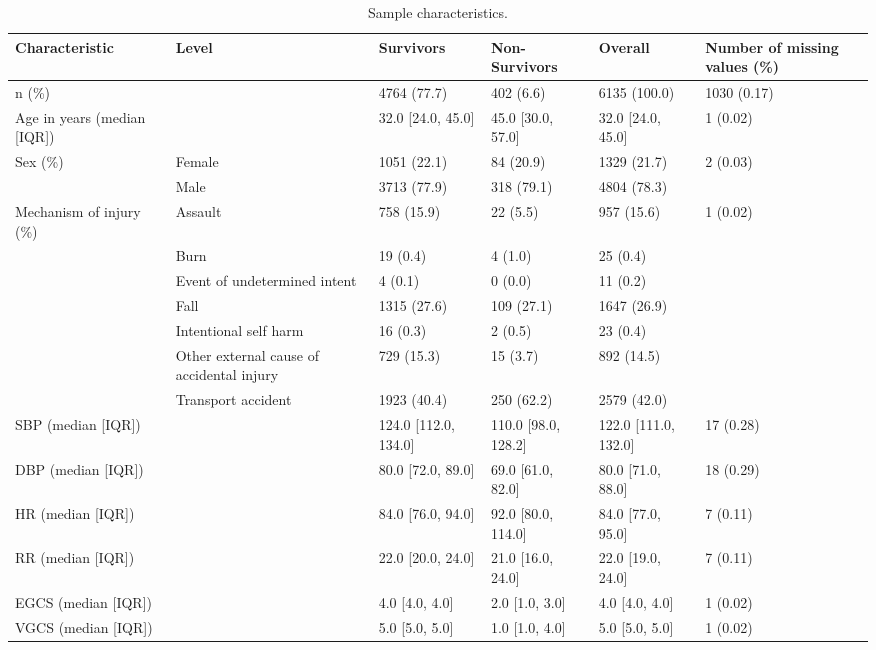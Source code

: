 \begin{table}[!ht]
\centering
\caption{Sample characteristics.} 
\label{tab:sample-characteristics}
\begin{adjustbox}{max width = \linewidth} 
\begin{threeparttable} 
\begin{tabular} 
{llllll}
  \toprule
Characteristic & Level & Survivors & Non-Survivors & Overall & Number of missing values (\%) \\ 
  \midrule
n (\%) &  & 4764 (77.7) & 402 (6.6) & 6135 (100.0) & 1030 (0.17) \\ 
  Age in years (median [IQR]) &  & 32.0 [24.0, 45.0] & 45.0 [30.0, 57.0] & 32.0 [24.0, 45.0] & 1 (0.02) \\ 
  Sex (\%) & Female & 1051 (22.1) & 84 (20.9) & 1329 (21.7) & 2 (0.03) \\ 
   & Male & 3713 (77.9) & 318 (79.1) & 4804 (78.3) &  \\ 
  Mechanism of injury (\%) & Assault & 758 (15.9) & 22 (5.5) & 957 (15.6) & 1 (0.02) \\ 
   & Burn & 19 (0.4) & 4 (1.0) & 25 (0.4) &  \\ 
   & Event of undetermined intent & 4 (0.1) & 0 (0.0) & 11 (0.2) &  \\ 
   & Fall & 1315 (27.6) & 109 (27.1) & 1647 (26.9) &  \\ 
   & Intentional self harm & 16 (0.3) & 2 (0.5) & 23 (0.4) &  \\ 
   & Other external cause of accidental injury & 729 (15.3) & 15 (3.7) & 892 (14.5) &  \\ 
   & Transport accident & 1923 (40.4) & 250 (62.2) & 2579 (42.0) &  \\ 
  SBP (median [IQR]) &  & 124.0 [112.0, 134.0] & 110.0 [98.0, 128.2] & 122.0 [111.0, 132.0] & 17 (0.28) \\ 
  DBP (median [IQR]) &  & 80.0 [72.0, 89.0] & 69.0 [61.0, 82.0] & 80.0 [71.0, 88.0] & 18 (0.29) \\ 
  HR (median [IQR]) &  & 84.0 [76.0, 94.0] & 92.0 [80.0, 114.0] & 84.0 [77.0, 95.0] & 7 (0.11) \\ 
  RR (median [IQR]) &  & 22.0 [20.0, 24.0] & 21.0 [16.0, 24.0] & 22.0 [19.0, 24.0] & 7 (0.11) \\ 
  EGCS (median [IQR]) &  & 4.0 [4.0, 4.0] & 2.0 [1.0, 3.0] & 4.0 [4.0, 4.0] & 1 (0.02) \\ 
  VGCS (median [IQR]) &  & 5.0 [5.0, 5.0] & 1.0 [1.0, 4.0] & 5.0 [5.0, 5.0] & 1 (0.02) \\ 

\end{tabular}
\end{threeparttable}
\end{adjustbox}
\end{table}
